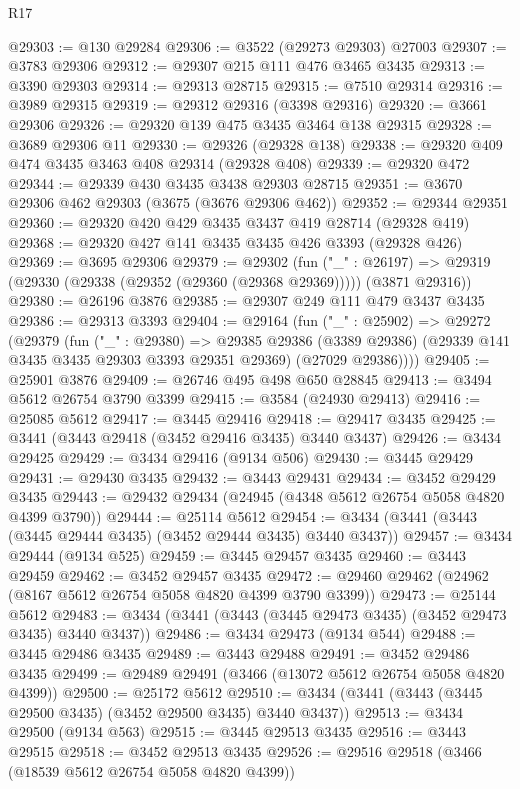 \begin{lexlean}{R17}
\begin{coremodule}
@29303 := @130 @29284
@29306 := @3522 (@29273 @29303) @27003
@29307 := @3783 @29306
@29312 := @29307 @215 @111 @476 @3465 @3435
@29313 := @3390 @29303
@29314 := @29313 @28715
@29315 := @7510 @29314
@29316 := @3989 @29315
@29319 := @29312 @29316 (@3398 @29316)
@29320 := @3661 @29306
@29326 := @29320 @139 @475 @3435 @3464 @138 @29315
@29328 := @3689 @29306 @11
@29330 := @29326 (@29328 @138)
@29338 := @29320 @409 @474 @3435 @3463 @408 @29314 (@29328 @408)
@29339 := @29320 @472
@29344 := @29339 @430 @3435 @3438 @29303 @28715
@29351 := @3670 @29306 @462 @29303 (@3675 (@3676 @29306 @462))
@29352 := @29344 @29351
@29360 := @29320 @420 @429 @3435 @3437 @419 @28714 (@29328 @419)
@29368 := @29320 @427 @141 @3435 @3435 @426 @3393 (@29328 @426)
@29369 := @3695 @29306
@29379 := @29302
    (fun ("_" : @26197) =>
    @29319 (@29330 (@29338 (@29352 (@29360 (@29368 @29369))))) (@3871 @29316))
@29380 := @26196 @3876
@29385 := @29307 @249 @111 @479 @3437 @3435
@29386 := @29313 @3393
@29404 := @29164
    (fun ("_" : @25902) =>
    @29272
      (@29379
        (fun ("_" : @29380) =>
        @29385
          @29386
          (@3389 @29386)
          (@29339 @141 @3435 @3435 @29303 @3393 @29351 @29369)
          (@27029 @29386))))
@29405 := @25901 @3876
@29409 := @26746 @495 @498 @650 @28845
@29413 := @3494 @5612 @26754 @3790 @3399
@29415 := @3584 (@24930 @29413)
@29416 := @25085 @5612
@29417 := @3445 @29416
@29418 := @29417 @3435
@29425 := @3441 (@3443 @29418 (@3452 @29416 @3435) @3440 @3437)
@29426 := @3434 @29425
@29429 := @3434 @29416 (@9134 @506)
@29430 := @3445 @29429
@29431 := @29430 @3435
@29432 := @3443 @29431
@29434 := @3452 @29429 @3435
@29443 := @29432 @29434 (@24945 (@4348 @5612 @26754 @5058 @4820 @4399 @3790))
@29444 := @25114 @5612
@29454 := @3434 (@3441 (@3443 (@3445 @29444 @3435) (@3452 @29444 @3435) @3440 @3437))
@29457 := @3434 @29444 (@9134 @525)
@29459 := @3445 @29457 @3435
@29460 := @3443 @29459
@29462 := @3452 @29457 @3435
@29472 := @29460 @29462 (@24962 (@8167 @5612 @26754 @5058 @4820 @4399 @3790 @3399))
@29473 := @25144 @5612
@29483 := @3434 (@3441 (@3443 (@3445 @29473 @3435) (@3452 @29473 @3435) @3440 @3437))
@29486 := @3434 @29473 (@9134 @544)
@29488 := @3445 @29486 @3435
@29489 := @3443 @29488
@29491 := @3452 @29486 @3435
@29499 := @29489 @29491 (@3466 (@13072 @5612 @26754 @5058 @4820 @4399))
@29500 := @25172 @5612
@29510 := @3434 (@3441 (@3443 (@3445 @29500 @3435) (@3452 @29500 @3435) @3440 @3437))
@29513 := @3434 @29500 (@9134 @563)
@29515 := @3445 @29513 @3435
@29516 := @3443 @29515
@29518 := @3452 @29513 @3435
@29526 := @29516 @29518 (@3466 (@18539 @5612 @26754 @5058 @4820 @4399))

\end{coremodule}
\end{lexlean}
